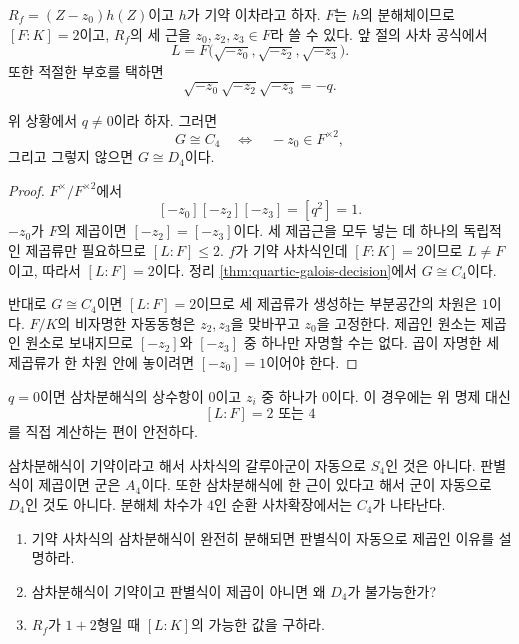 $R_f=(Z-z_0)h(Z)$이고 $h$가 기약 이차라고 하자. $F$는 $h$의 분해체이므로 $[F:K]=2$이고, $R_f$의 세 근을 $z_0,z_2,z_3\in F$라 쓸 수 있다. 앞 절의 사차 공식에서
\[
  L=F\bigl(\sqrt{-z_0},\sqrt{-z_2},\sqrt{-z_3}\bigr).
\]
또한 적절한 부호를 택하면
\[
  \sqrt{-z_0}\sqrt{-z_2}\sqrt{-z_3}=-q.
\]

\begin{proposition}[실용적인 제곱 판정]
\label{prop:c4-d4-square-test}
위 상황에서 $q\ne0$이라 하자. 그러면
\[
  G\cong C_4
  \quad\Longleftrightarrow\quad
  -z_0\in F^{\times2},
\]
그리고 그렇지 않으면 $G\cong D_4$이다.
\end{proposition}

\begin{proof}
$F^\times/F^{\times2}$에서
\[
  [-z_0][-z_2][-z_3]=[q^2]=1.
\]
$-z_0$가 $F$의 제곱이면 $[-z_2]=[-z_3]$이다. 세 제곱근을 모두 넣는 데 하나의 독립적인 제곱류만 필요하므로 $[L:F]\le2$. $f$가 기약 사차식인데 $[F:K]=2$이므로 $L\ne F$이고, 따라서 $[L:F]=2$이다. 정리 \ref{thm:quartic-galois-decision}에서 $G\cong C_4$이다.

반대로 $G\cong C_4$이면 $[L:F]=2$이므로 세 제곱류가 생성하는 부분공간의 차원은 $1$이다. $F/K$의 비자명한 자동동형은 $z_2,z_3$을 맞바꾸고 $z_0$을 고정한다. 제곱인 원소는 제곱인 원소로 보내지므로 $[-z_2]$와 $[-z_3]$ 중 하나만 자명할 수는 없다. 곱이 자명한 세 제곱류가 한 차원 안에 놓이려면 $[-z_0]=1$이어야 한다.
\end{proof}

$q=0$이면 삼차분해식의 상수항이 $0$이고 $z_i$ 중 하나가 $0$이다. 이 경우에는 위 명제 대신
\[
  [L:F]=2\text{ 또는 }4
\]
를 직접 계산하는 편이 안전하다.

\begin{pitfall}
삼차분해식이 기약이라고 해서 사차식의 갈루아군이 자동으로 $S_4$인 것은 아니다. 판별식이 제곱이면 군은 $A_4$이다. 또한 삼차분해식에 한 근이 있다고 해서 군이 자동으로 $D_4$인 것도 아니다. 분해체 차수가 $4$인 순환 사차확장에서는 $C_4$가 나타난다.
\end{pitfall}

\begin{checkpoint}
\begin{enumerate}[label=(\alph*)]
  \item 기약 사차식의 삼차분해식이 완전히 분해되면 판별식이 자동으로 제곱인 이유를 설명하라.
  \item 삼차분해식이 기약이고 판별식이 제곱이 아니면 왜 $D_4$가 불가능한가?
  \item $R_f$가 $1+2$형일 때 $[L:K]$의 가능한 값을 구하라.
\end{enumerate}
\end{checkpoint}
